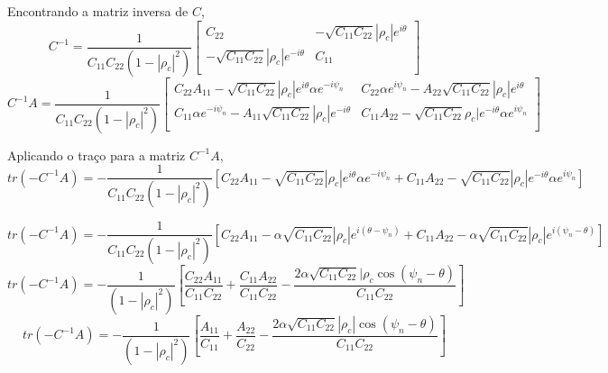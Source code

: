 Encontrando a matriz inversa de $C$,
\begin{equation}\label{eqn44}
	C^{-1}=\frac{1}{C_{11}C_{22}(1-|\rho_c|^2)}\left[
\begin{array}{cc}
	C_{22}              & -\sqrt{C_{11}C_{22}}|\rho_c |e^{i\theta} \\
 -\sqrt{C_{11}C_{22}}|\rho_c|e^{-i\theta} & C_{11}\\
\end{array}\right]
\end{equation}
\begin{equation}\label{eqn45}
	C^{-1}A=\frac{1}{C_{11}C_{22}(1-|\rho_c|^2)}\left[
\begin{array}{cc}
	C_{22}A_{11}-\sqrt{C_{11}C_{22}}|\rho_c|e^{i\theta}\alpha e^{-i\psi_n} & C_{22} \alpha e^{i\psi_n}-A_{22}\sqrt{C_{11}C_{22}}|\rho_c|e^{i\theta} \\
	C_{11}\alpha e^{-i\psi_n}-A_{11}\sqrt{C_{11}C_{22}}|\rho_c|e^{-i\theta} & C_{11}A_{22}-\sqrt{C_{11}C_{22}}\rho_c|e^{-i\theta}\alpha e^{i\psi_n} \\
\end{array}\right]
\end{equation}

Aplicando o traço para a matriz $C^{-1}A$,
{\footnotesize
\begin{equation}\label{eqn46}
	tr(-C^{-1}A)=-\frac{1}{C_{11}C_{22}(1-|\rho_c|^2)}\left[
	C_{22}A_{11}-\sqrt{C_{11}C_{22}}|\rho_c |e^{i\theta}\alpha e^{-i\psi_n} + C_{11}A_{22}-\sqrt{C_{11}C_{22}}|\rho_c|e^{-i\theta}\alpha e^{i\psi_n} \right]
\end{equation}}

{\footnotesize
\begin{equation}\label{eqn47}
	tr(-C^{-1}A)=-\frac{1}{C_{11}C_{22}(1-|\rho_c|^2)}\left[
		C_{22}A_{11}-\alpha \sqrt{C_{11}C_{22}}|\rho_c|e^{i(\theta-\psi_n)} + C_{11}A_{22}-\alpha \sqrt{C_{11}C_{22}}|\rho_c|e^{i(\psi_n-\theta)}\right]
\end{equation}}
{\footnotesize
\begin{equation}\label{eqn48}
	tr(-C^{-1}A)=-\frac{1}{(1-|\rho_c|^2)}\left[
	\frac{C_{22}A_{11}}{C_{11}C_{22}}+\frac{C_{11}A_{22}}{C_{11}C_{22}}-\frac{2\alpha \sqrt{C_{11}C_{22}}|\rho_c \cos(\psi_n-\theta)}{C_{11}C_{22}}\right]
\end{equation}}
{\footnotesize
\begin{equation}\label{eqn49}
	tr(-C^{-1}A)=-\frac{1}{(1-|\rho_c|^2)}\left[
	\frac{A_{11}}{C_{11}}+\frac{A_{22}}{C_{22}}-\frac{2\alpha \sqrt{C_{11}C_{22}}|\rho_c |\cos(\psi_n-\theta)}{C_{11}C_{22}}\right]
\end{equation}}

